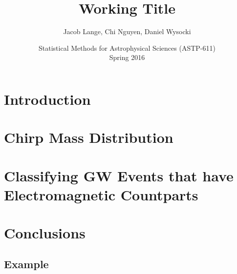 \documentclass[12pt]{article}
\title{
  Working Title
}
\author{
  Jacob Lange, Chi Nguyen, Daniel Wysocki
}
\date{
  Statistical Methods for Astrophysical Sciences (ASTP-611)
  \\
  Spring 2016
}
\begin{document}
\maketitle


\begin{abstract}


\end{abstract}

\section{Introduction}
\label{sec:intro}

\section{Chirp Mass Distribution}
\label{sec:dist}





\section{Classifying GW Events that have Electromagnetic Countparts}
\label{sec:classifier}


\section{Conclusions}
\label{sec:conclusions}



\printbibliography[heading=subbibliography]

\begin{appendices}

\section{Example}
\label{app:example}


\end{appendices}
\end{document}
